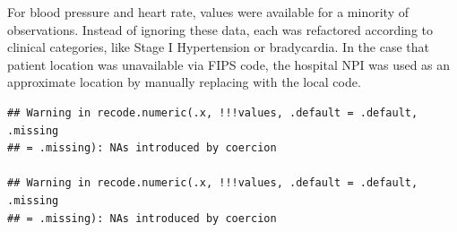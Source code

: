 \documentclass[preprint, 3p,
authoryear]{elsarticle} %
\newenvironment{Shaded}{\begin{snugshade}}{\end{snugshade}}
\newcommand{\AttributeTok}[1]{\textcolor[rgb]{0.77,0.63,0.00}{#1}}
\newcommand{\CommentTok}[1]{\textcolor[rgb]{0.56,0.35,0.01}{\textit{#1}}}
\newcommand{\ConstantTok}[1]{\textcolor[rgb]{0.00,0.00,0.00}{#1}}
\newcommand{\DecValTok}[1]{\textcolor[rgb]{0.00,0.00,0.81}{#1}}
\newcommand{\DocumentationTok}[1]{\textcolor[rgb]{0.56,0.35,0.01}{\textbf{\textit{#1}}}}
\newcommand{\FunctionTok}[1]{\textcolor[rgb]{0.00,0.00,0.00}{#1}}
\newcommand{\NormalTok}[1]{#1}
\newcommand{\OtherTok}[1]{\textcolor[rgb]{0.56,0.35,0.01}{#1}}
\newcommand{\SpecialCharTok}[1]{\textcolor[rgb]{0.00,0.00,0.00}{#1}}
\begin{document}
For blood pressure and heart rate, values were available for a minority
of observations. Instead of ignoring these data, each was refactored
according to clinical categories, like Stage I Hypertension or
bradycardia. In the case that patient location was unavailable via FIPS
code, the hospital NPI was used as an approximate location by manually
replacing with the local code.

\begin{verbatim}
## Warning in recode.numeric(.x, !!!values, .default = .default, .missing
## = .missing): NAs introduced by coercion

## Warning in recode.numeric(.x, !!!values, .default = .default, .missing
## = .missing): NAs introduced by coercion
\end{verbatim}

\begin{Shaded}
\end{Shaded}
\end{document}
